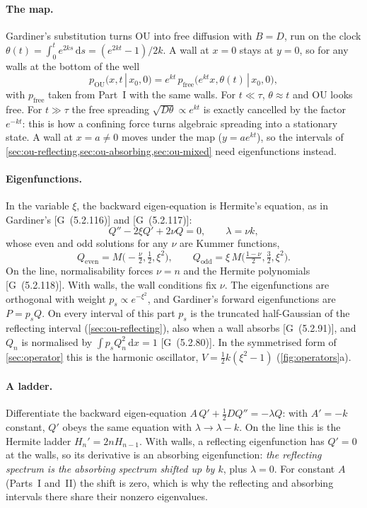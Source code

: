 \documentclass[11pt]{article}
\numberwithin{equation}{section}
\newcommand{\dd}{\mathrm{d}}
\newcommand{\given}{\,|\,}
\newcommand{\G}[1]{[G~(#1)]}
\begin{document}
\paragraph{The map.} Gardiner's substitution turns OU into free diffusion with $B=D$, run on the clock
$\theta(t)=\int_0^te^{2ks}\,\dd s=(e^{2kt}-1)/2k$. A wall at $x=0$ stays at $y=0$, so for any walls at the
bottom of the well
\begin{equation}
  p_{\text{OU}}(x,t\given x_0,0)=e^{kt}\,p_{\text{free}}\bigl(e^{kt}x,\theta(t)\given x_0,0\bigr),
  \label{eq:ou-map}
\end{equation}
with $p_{\text{free}}$ taken from Part~I with the same walls. For $t\ll\tau$, $\theta\approx t$ and OU looks
free. For $t\gg\tau$ the free spreading $\sqrt{D\theta}\propto e^{kt}$ is exactly cancelled by the factor
$e^{-kt}$: this is how a confining force turns algebraic spreading into a stationary state. A wall at
$x=a\neq0$ moves under the map ($y=ae^{kt}$), so the intervals of
\cref{sec:ou-reflecting,sec:ou-absorbing,sec:ou-mixed} need eigenfunctions instead.

\paragraph{Eigenfunctions.} In the variable $\xi$, the backward eigen-equation is Hermite's equation, as in
Gardiner's \G{5.2.116} and \G{5.2.117}:
\begin{equation}
  Q''-2\xi Q'+2\nu Q=0,\qquad \lambda=\nu k,
\end{equation}
whose even and odd solutions for any $\nu$ are Kummer functions,
\begin{equation}
  Q_{\text{even}}=M\bigl(-\tfrac\nu2,\tfrac12,\xi^2\bigr),\qquad
  Q_{\text{odd}}=\xi\,M\bigl(\tfrac{1-\nu}2,\tfrac32,\xi^2\bigr).
  \label{eq:kummer}
\end{equation}
On the line, normalisability forces $\nu=n$ and the Hermite polynomials \G{5.2.118}. With walls, the wall
conditions fix $\nu$. The eigenfunctions are orthogonal with weight $p_s\propto e^{-\xi^2}$, and Gardiner's forward
eigenfunctions are $P=p_sQ$. On every interval of this part $p_s$ is the truncated half-Gaussian of the reflecting
interval (\cref{sec:ou-reflecting}), also when a wall absorbs \G{5.2.91}, and $Q_n$ is normalised by
$\int p_sQ_n^2\,\dd x=1$ \G{5.2.80}. In the symmetrised
form of \cref{sec:operator} this is the harmonic oscillator, $V=\tfrac12k(\xi^2-1)$
(\cref{fig:operators}a).

\paragraph{A ladder.} Differentiate the backward eigen-equation $A\,Q'+\tfrac12DQ''=-\lambda Q$: with
$A'=-k$ constant, $Q'$ obeys the same equation with $\lambda\to\lambda-k$. On the line this is the Hermite
ladder $H_n'=2nH_{n-1}$. With walls, a reflecting eigenfunction has $Q'=0$ at the walls, so its derivative is an
absorbing eigenfunction: \emph{the reflecting spectrum is the absorbing spectrum shifted up by $k$}, plus
$\lambda=0$. For constant $A$ (Parts~I and~II) the shift is zero, which is why the reflecting and absorbing
intervals there share their nonzero eigenvalues.
\end{document}

